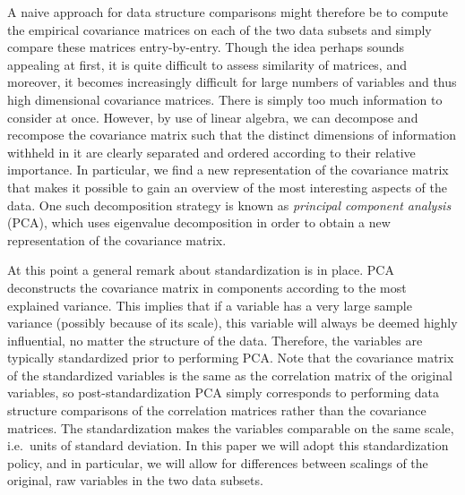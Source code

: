 \documentclass[titlepage,11pt,twoside]{article}
\newcommand{\hl}[1]{\textcolor{magenta}{#1}}
\begin{document}
A naive approach for data structure comparisons might therefore be to compute the empirical covariance matrices on each of the two data subsets and simply compare these matrices entry-by-entry. Though the idea perhaps sounds appealing at first, it is quite difficult to assess similarity of matrices, and moreover, it becomes increasingly difficult for large numbers of variables and thus high dimensional covariance matrices. There is simply too much information to consider at once. However, by use of linear algebra, we can decompose and recompose the covariance matrix such that the distinct dimensions of information withheld in it are clearly separated and ordered according to their relative importance. In particular, we find a new representation of the covariance matrix that makes it possible to gain an overview of the most interesting aspects of the data. One such decomposition strategy is known as \textit{principal component analysis} (PCA), which uses eigenvalue decomposition in order to obtain a new representation of the covariance matrix.

At this point a general remark about standardization is in place. PCA deconstructs the covariance matrix in components according to the most explained variance. This implies that if a variable has a very large sample variance (possibly because of its scale), this variable will always be deemed highly influential, no matter the structure of the data. Therefore, the variables are typically standardized prior to performing PCA. Note that the covariance matrix of the standardized variables is the same as the correlation matrix of the original variables, so post-standardization PCA simply corresponds to performing data structure comparisons of the correlation matrices rather than the covariance matrices. The standardization makes the variables comparable on the same scale, i.e.\ units of standard deviation. In this paper we will adopt this standardization policy, and in particular, we will allow for differences between scalings of the original, raw variables in the two data subsets.

\end{document}
